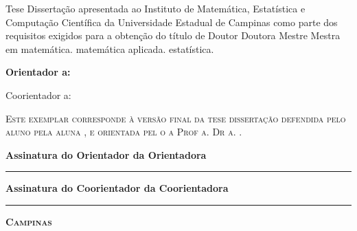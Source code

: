 \begin{flushright}
  \begin{minipage}[c]{.5\textwidth}
    \ifx\mestrado\undefined
    Tese
    \else
    Dissertação
    \fi
    apresentada ao Instituto de Matemática,
    Estatística e Computação Científica da Universidade
    Estadual de Campinas como parte dos requisitos exigidos
    para a obtenção do título de
    \ifx\mestrado\undefined
    \ifx\femaleAuthor\undefined
    Doutor
    \else
    Doutora
    \fi
    \else
    \ifx\femaleAuthor\undefined
    Mestre
    \else
    Mestra
    \fi
    \fi
    em
    \ifx\matematica\undefined
    \else
    matemática.
    \fi
    \ifx\aplicada\undefined
    \else
    matemática aplicada.
    \fi
    \ifx\estatistica\undefined
    \else
    estatística.
    \fi
  \end{minipage}
\end{flushright}
\vspace{.5cm}

\noindent
{\bfseries
\noindent
Orientador\ifx\femaleOrientador\undefined
\else
a\fi: \orientador
\vspace{.25cm}

\ifx\coorientador\undefined
\else
\noindent
Coorientador\ifx\femaleCoorientador\undefined
\else
a\fi: \coorientador
\fi
}
\vspace{.5cm}

\noindent
\begin{minipage}[c]{.5\textwidth}
  \noindent
  {\footnotesize \scshape
  Este exemplar corresponde à versão final da
  \ifx\mestrado\undefined
  tese
  \else
  dissertação
  \fi
  defendida
  \ifx\femaleAuthor\undefined
  pelo aluno
  \else
  pela aluna
  \fi
  \autor,
  e orientada pel\ifx\femaleOrientador\undefined
  o\else
  a\fi{} Prof\ifx\femaleOrientador\undefined
  \else
  a\fi. Dr\ifx\femaleOrientador\undefined
  \else
  a\fi. \orientador.
  }
\end{minipage}
\vspace{.5cm}

\noindent
{\small \bfseries
\noindent
Assinatura
\ifx\femaleOrientador\undefined
do Orientador
\else
da Orientadora
\fi

\vspace{.3cm}
\noindent
\rule[1pt]{7cm}{.5pt}  %
}
\vspace{.4cm}

\ifx\coorientador\undefined
\else
{\small \bfseries
\noindent
Assinatura
\ifx\femaleCoorientador\undefined
do Coorientador
\else
da Coorientadora
\fi

\vspace{.3cm}
\noindent
\rule[1pt]{7cm}{.5pt}  %
}
\fi
\vfill
\begin{center}
  {\small \scshape \bfseries Campinas \\ \ano}
\end{center}
